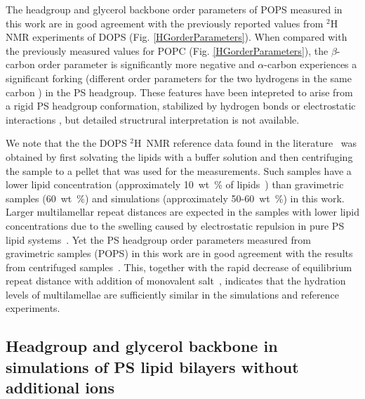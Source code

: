 \documentclass[aps,prl,superscriptaddress,twocolumn]{revtex4}
\begin{document}
The headgroup and glycerol backbone order parameters of 
POPS measured in this work are in good agreement with the previously reported
values from $^2$H\,NMR experiments of DOPS \cite{browning80} (Fig. \ref{HGorderParameters}).
When compared with the previously measured values for POPC \cite{ferreira13} (Fig. \ref{HGorderParameters}),
the $\beta$-carbon order parameter is significantly more negative and $\alpha$-carbon
experiences a significant forking (different order parameters for the two hydrogens in the same carbon \cite{ollila16}) in the PS headgroup.
These features have been intepreted to arise from a rigid PS headgroup
conformation, stabilized by hydrogen bonds or electrostatic
interactions \cite{browning80,buldt81}, but detailed structrural interpretation is not
available. 

We note that the the DOPS $^2$H~NMR reference data found in the literature~\cite{browning80,roux90} was obtained by first solvating
the lipids with a buffer solution and then centrifuging the sample to a pellet that was used for the measurements. Such samples have a lower lipid concentration
(approximately 10~wt~\% of lipids~\cite{browning80,roux88,roux90}) than 
gravimetric samples (60~wt~\%) and simulations (approximately 50-60~wt~\%) in this work.
Larger multilamellar repeat distances are expected in the samples with lower lipid
concentrations due to the swelling caused by electrostatic repulsion in pure PS lipid systems~\cite{millman82}.
Yet the PS headgroup order parameters measured from gravimetric samples (POPS) in this work
are in good agreement with the results from centrifuged samples~\cite{browning80}. This, together with the rapid decrease of equilibrium repeat distance with addition of monovalent salt~\cite{millman82,rand89}, indicates that the hydration levels of multilamellae are sufficiently similar in the simulations and reference experiments.


\subsection{Headgroup and glycerol backbone in simulations of PS lipid bilayers without additional ions}
\end{document}
